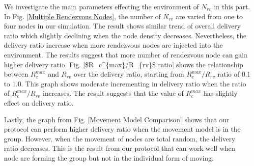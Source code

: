\documentclass[conference]{IEEEtran}
\begin{document}
We investigate the main parameters effecting the environment of $N_{rv}$ in this part.
In Fig. \ref{Multiple Rendezvous Nodes}, the number of $N_{rv}$ are varied from one to four nodes in our simulation.
The result shows similar trend of overall delivery ratio which slightly declining when the node density decreases.
Nevertheless, the delivery ratio increase when more rendezvous nodes are injected into the environment.
The results suggest that more number of rendezvous node can gain higher delivery ratio.
Fig. \ref{$R_c^{max}/R_{rv}$ ratio} shows the relationship between $R_c^{max}$ and $R_{rv}$ over the delivery ratio, starting from  $R_c^{max}/R_{rv}$ ratio of 0.1 to 1.0.
This graph shows moderate incrementing in delivery ratio when the ratio of $R_c^{max}/R_{rv}$ increases.
The result suggests that the value of $R_c^{max}$ has slightly effect on delivery ratio. 

Lastly, the graph from Fig. \ref{Movement Model Comparison} shows that our protocol can perform higher delivery ratio when the movement model is in the group.
However, when the movement of nodes are total random, the delivery ratio decreases.
This is the result from our protocol that can work well when node are forming the group but not in the individual form of moving.


\end{document}
